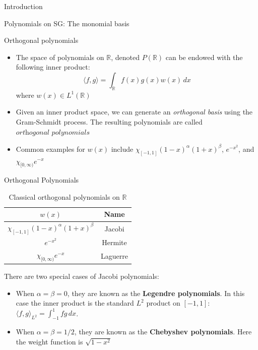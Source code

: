 \documentclass[xcolor = dvipsnames]{beamer}
\begin{document}
\begin{section}{Introduction}
\begin{frame}{Polynomials on SG: The monomial basis}
\end{frame}

\begin{frame}{Orthogonal polynomials}
    \begin{itemize}
        \item The space of polynomials on $\mathbb{R}$, denoted $P(\mathbb{R})$ can be endowed with the following inner product: 
        $$ \langle f,g \rangle = \int_{\mathbb{R}}f(x)g(x)w(x)\,dx$$
        where $w(x) \in L^1(\mathbb{R})$
        \pause
        \item Given an inner product space, we can generate an \textit{orthogonal basis} using the Gram-Schmidt process. The resulting polynomials are called $\textit{orthogonal polynomials}$
        \pause
        \item Common examples for $w(x)$ include $\chi_{[-1,1]}(1-x)^\alpha(1+x)^\beta$, $e^{-x^2}$, and $\chi_{[0,\infty)}e^{-x}$
    \end{itemize}
\end{frame}
\end{section}

\begin{frame}{Orthogonal Polynomials}
    \begin{table}[]
        \centering
        \begin{tabular}{cc}
             
             $w(x)$ & Name \\
             \hline
             \hline
             $\chi_{[-1,1]}(1-x)^\alpha(1+x)^\beta$ & Jacobi \\
             
             $e^{-x^2}$ & Hermite \\
             
             $\chi_{[0,\infty)}e^{-x}$ & Laguerre \\
             
        \end{tabular}
        \caption{Classical orthogonal polynomials on $\mathbb{R}$}
        \label{tab:Classical polys}
    \end{table}
    \pause
    There are two special cases of Jacobi polynomials: 
    \begin{itemize}
        \item When $\alpha = \beta = 0$, they are known as the \textbf{Legendre polynomials}. In this case the inner product is the standard $L^2$ product on $[-1,1]$: $\langle f, g \rangle_{L^2} = \int_{-1}^{1}fg\,dx$.
        \item When $\alpha = \beta = 1/2$, they are known as the \textbf{Chebyshev polynomials}. Here the weight function is $\sqrt{1-x^2}$ 
    \end{itemize} 
    
\end{frame}
\end{document}
